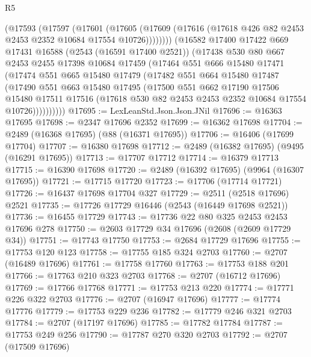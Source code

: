 \begin{lexlean}{R5}
\begin{coremodule}
          (@17593
            (@17597
              (@17601
                (@17605
                  (@17609 (@17616 (@17618 @426 @82 @2453 @2453 @2352 @10684 @17554 @10726))))))))
        (@16582
          @17400
          @17422
          @669
          @17431
          @16588
          (@2543 (@16591 @17400 @2521))
          (@17438
            @530
            @80
            @667
            @2453
            @2455
            @17398
            @10684
            @17459
            (@17464
              @551
              @666
              @15480
              @17471
              (@17474
                @551
                @665
                @15480
                @17479
                (@17482
                  @551
                  @664
                  @15480
                  @17487
                  (@17490
                    @551
                    @663
                    @15480
                    @17495
                    (@17500
                      @551
                      @662
                      @17190
                      @17506
                      @15480
                      @17511
                      @17516
                      (@17618 @530 @82 @2453 @2453 @2352 @10684 @17554 @10726))))))))))
@17695 := LexLeanStd.Json.Json.JNil
@17696 := @16363 @17695
@17698 := @2347 @17696 @2352
@17699 := @16362 @17698
@17704 := @2489 (@16368 @17695) (@88 (@16371 @17695))
@17706 := @16406 (@17699 @17704)
@17707 := @16380 @17698
@17712 := @2489 (@16382 @17695) (@9495 (@16291 @17695))
@17713 := @17707 @17712
@17714 := @16379 @17713
@17715 := @16390 @17698
@17720 := @2489 (@16392 @17695) (@9964 (@16307 @17695))
@17721 := @17715 @17720
@17723 := @17706 (@17714 @17721)
@17726 := @16437 @17698 @17704 @327
@17729 := @2511 (@2518 @17696) @2521
@17735 := @17726 @17729 @16446 (@2543 (@16449 @17698 @2521))
@17736 := @16455 @17729
@17743 := @17736 @22 @80 @325 @2453 @2453 @17696 @278
@17750 := @2603 @17729 @34 @17696 (@2608 (@2609 @17729 @34))
@17751 := @17743 @17750
@17753 := @2684 @17729 @17696
@17755 := @17753 @120 @123
@17758 := @17755 @185 @324 @2703
@17760 := @2707 (@16489 @17696)
@17761 := @17758 @17760
@17763 := @17753 @188 @201
@17766 := @17763 @210 @323 @2703
@17768 := @2707 (@16712 @17696)
@17769 := @17766 @17768
@17771 := @17753 @213 @220
@17774 := @17771 @226 @322 @2703
@17776 := @2707 (@16947 @17696)
@17777 := @17774 @17776
@17779 := @17753 @229 @236
@17782 := @17779 @246 @321 @2703
@17784 := @2707 (@17197 @17696)
@17785 := @17782 @17784
@17787 := @17753 @249 @256
@17790 := @17787 @270 @320 @2703
@17792 := @2707 (@17509 @17696)

\end{coremodule}
\end{lexlean}
